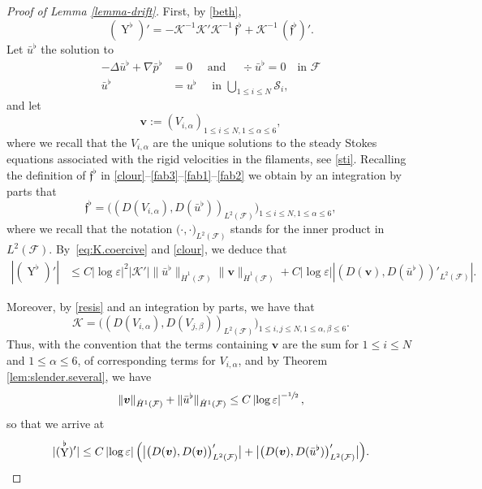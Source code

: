 \documentclass[11pt]{article}
\newcommand{\bv}{\bm{v}}
\let\eps\varepsilon
\DeclareMathOperator{\Y}{Y}
\theoremstyle{definition}
\theoremstyle{remark}
\begin{document}
\begin{proof}[Proof of Lemma \ref{lemma-drift}]
First, by \eqref{beth},
\begin{equation}
(\Y^\flat)'
= - \mathcal K^{-1} \mathcal K' \mathcal K^{-1} \, \mathfrak{f}^\flat + \mathcal K^{-1} \, (\mathfrak{f}^\flat)'.
\end{equation}
Let $\bar u^\flat$ the solution to
\begin{align*}
- \Delta \bar u^\flat + \nabla \bar p^\flat &= 0 \quad \text{ and }\quad \div {\bar u^\flat} = 0 \quad \text{in } \mathcal F \\
\bar u^\flat &= u^\flat \quad \text{ in } \bigcup_{1 \leq i \leq N} \mathcal S_i,
\end{align*}
and let
\[
\bv := (V_{i,\alpha})_{1\leq i \leq N, 1 \leq \alpha \leq 6},\]
where we recall that the $ V_{i,\alpha}$ are the unique solutions to the steady Stokes equations associated with the rigid velocities in the filaments, see \eqref{sti}.
Recalling the definition of $ \mathfrak{f}^\flat $ in \eqref{clour}--\eqref{fab3}--\eqref{fab1}--\eqref{fab2}
we obtain by an integration by parts that
\begin{equation*}
\mathfrak{f}^\flat = \Big((D (V_{i,\alpha}),D (\bar u^\flat))_{L^2(\mathcal F)} \Big)_{1\leq i \leq N, 1 \leq \alpha \leq 6},
\end{equation*}
where we recall that the notation $\big(\cdot, \cdot\big)_{L^2(\mathcal F)}$ stands for the inner product in $L^2(\mathcal F)$.
By~\eqref{eq:K.coercive} and \eqref{clour},
we deduce that
\begin{equation}
\begin{aligned}
|(\Y^\flat)'| &\leq C \left|\log \eps\right|^2 |\mathcal K'| \| \bar u^\flat\|_{\dot H^1(\mathcal F)} \|\bv\|_{\dot H^1(\mathcal F)}
+ C \left|\log \eps\right| |(D (\bv), D (\bar u^\flat))'_{L^2(\mathcal F)}|.
\end{aligned}
\end{equation}

Moreover, by \eqref{resis} and an integration by parts, we have that
\begin{equation*}
\mathcal K = \Big((D (V_{i,\alpha}),D (V_{j,\beta}))_{L^2(\mathcal F)} \Big)_{1\leq i,j \leq N, 1 \leq \alpha,\beta \leq 6}.
\end{equation*}
Thus, with the convention that the terms containing $\bv$ are the sum for $1\leq i \leq N$ and $ 1 \leq \alpha \leq 6$, of corresponding terms for $V_{i,\alpha}$,
and by Theorem \ref{lem:slender.several}, we have
\[
\|\bv \|_{\dot H^1(\mathcal F)}
+ \| \bar u^\flat \|_{\dot H^1(\mathcal F)}
\leq C \left|\log \eps\right|^{-\sfrac12},\]
so that we arrive at
\begin{equation} \label{est:s..}
|(\Y^\flat)'| \leq C \left|\log \eps\right| \Bigl(\bigl|\big(D (\bv),
D (\bv)\big)_{L^2(\mathcal F)}'\bigr|
+ \bigl|\big(D(\bv), D (\bar u^\flat)\big)'_{L^2(\mathcal F)}\bigr|
\Bigr).
\end{equation}


\end{proof}
\end{document}
